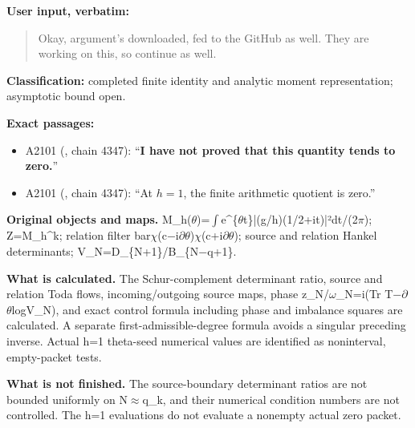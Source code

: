\textbf{User input, verbatim:}

\begin{quote}
Okay, argument's downloaded, fed to the GitHub as well. They are working
on this, so continue as well.
\end{quote}

\textbf{Classification:} completed finite identity and analytic moment
representation; asymptotic bound open.

\textbf{Exact passages:}

\begin{itemize}
\tightlist
\item
  A2101 (\protect{}, chain
  4347): ``\textbf{I have not proved that this quantity tends to
  zero.}''
\item
  A2101 (\protect{}, chain
  4347): ``At \(h=1\), the finite arithmetic quotient is zero.''
\end{itemize}

\textbf{Original objects and maps.}
M\_h(\allowbreak{}\ensuremath{θ}\allowbreak{})=\allowbreak{}\ensuremath{∫}\allowbreak{}e\textasciicircum{}\{\allowbreak{}\ensuremath{θ}\allowbreak{}t\}|(g/h)(1/2+it)|²dt/(2\allowbreak{}\ensuremath{π}\allowbreak{});
Z=M\_h\^{}k; relation filter
bar\allowbreak{}\ensuremath{χ}\allowbreak{}(c\allowbreak{}\ensuremath{−}\allowbreak{}i\allowbreak{}\ensuremath{∂}\allowbreak{}\allowbreak{}\ensuremath{θ}\allowbreak{})\allowbreak{}\ensuremath{χ}\allowbreak{}(c+i\allowbreak{}\ensuremath{∂}\allowbreak{}\allowbreak{}\ensuremath{θ}\allowbreak{});
source and relation Hankel determinants;
V\_N=D\_\{N+1\}/B\_\{N\allowbreak{}\ensuremath{−}\allowbreak{}q+1\}.

\textbf{What is calculated.} The Schur-complement determinant ratio,
source and relation Toda flows, incoming/outgoing source maps, phase
z\_N/\allowbreak{}\ensuremath{ω}\allowbreak{}\_N=i(Tr
T\allowbreak{}\ensuremath{−}\allowbreak{}\allowbreak{}\ensuremath{∂}\allowbreak{}\allowbreak{}\ensuremath{θ}\allowbreak{}logV\_N),
and exact control formula including phase and imbalance squares are
calculated. A separate first-admissible-degree formula avoids a singular
preceding inverse. Actual h=1 theta-seed numerical values are identified
as noninterval, empty-packet tests.

\textbf{What is not finished.} The source-boundary determinant ratios
are not bounded uniformly on
N\allowbreak{}\ensuremath{≈}\allowbreak{}q\_k, and their numerical
condition numbers are not controlled. The h=1 evaluations do not
evaluate a nonempty actual zero packet.

